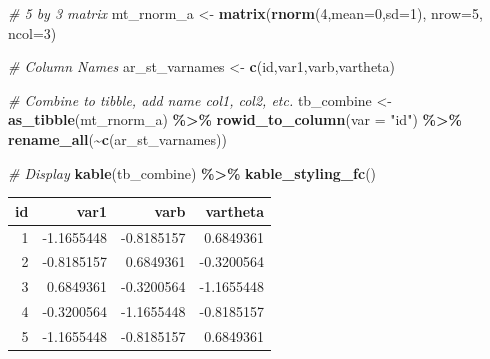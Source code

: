 \documentclass[
]{book}
\newenvironment{Shaded}{\begin{snugshade}}{\end{snugshade}}
\newcommand{\CommentTok}[1]{\textcolor[rgb]{0.56,0.35,0.01}{\textit{#1}}}
\newcommand{\DataTypeTok}[1]{\textcolor[rgb]{0.13,0.29,0.53}{#1}}
\newcommand{\DecValTok}[1]{\textcolor[rgb]{0.00,0.00,0.81}{#1}}
\newcommand{\KeywordTok}[1]{\textcolor[rgb]{0.13,0.29,0.53}{\textbf{#1}}}
\newcommand{\NormalTok}[1]{#1}
\newcommand{\OperatorTok}[1]{\textcolor[rgb]{0.81,0.36,0.00}{\textbf{#1}}}
\newcommand{\StringTok}[1]{\textcolor[rgb]{0.31,0.60,0.02}{#1}}
\begin{document}
\begin{Shaded}
\begin{Highlighting}[]
\CommentTok{\# 5 by 3 matrix}
\NormalTok{mt\_rnorm\_a \textless{}{-}}\StringTok{ }\KeywordTok{matrix}\NormalTok{(}\KeywordTok{rnorm}\NormalTok{(}\DecValTok{4}\NormalTok{,}\DataTypeTok{mean=}\DecValTok{0}\NormalTok{,}\DataTypeTok{sd=}\DecValTok{1}\NormalTok{), }\DataTypeTok{nrow=}\DecValTok{5}\NormalTok{, }\DataTypeTok{ncol=}\DecValTok{3}\NormalTok{)}

\CommentTok{\# Column Names}
\NormalTok{ar\_st\_varnames \textless{}{-}}\StringTok{ }\KeywordTok{c}\NormalTok{(}\StringTok{\textquotesingle{}id\textquotesingle{}}\NormalTok{,}\StringTok{\textquotesingle{}var1\textquotesingle{}}\NormalTok{,}\StringTok{\textquotesingle{}varb\textquotesingle{}}\NormalTok{,}\StringTok{\textquotesingle{}vartheta\textquotesingle{}}\NormalTok{)}

\CommentTok{\# Combine to tibble, add name col1, col2, etc.}
\NormalTok{tb\_combine \textless{}{-}}\StringTok{ }\KeywordTok{as\_tibble}\NormalTok{(mt\_rnorm\_a) }\OperatorTok{\%\textgreater{}\%}
\StringTok{  }\KeywordTok{rowid\_to\_column}\NormalTok{(}\DataTypeTok{var =} \StringTok{"id"}\NormalTok{) }\OperatorTok{\%\textgreater{}\%}
\StringTok{  }\KeywordTok{rename\_all}\NormalTok{(}\OperatorTok{\textasciitilde{}}\KeywordTok{c}\NormalTok{(ar\_st\_varnames))}

\CommentTok{\# Display}
\KeywordTok{kable}\NormalTok{(tb\_combine) }\OperatorTok{\%\textgreater{}\%}\StringTok{ }\KeywordTok{kable\_styling\_fc}\NormalTok{()}
\end{Highlighting}
\end{Shaded}

\begin{table}[!h]
\centering
\begin{tabular}{r|r|r|r}
\hline
id & var1 & varb & vartheta\\
\hline
\rowcolor{gray!6}  1 & -1.1655448 & -0.8185157 & 0.6849361\\
\hline
2 & -0.8185157 & 0.6849361 & -0.3200564\\
\hline
\rowcolor{gray!6}  3 & 0.6849361 & -0.3200564 & -1.1655448\\
\hline
4 & -0.3200564 & -1.1655448 & -0.8185157\\
\hline
\rowcolor{gray!6}  5 & -1.1655448 & -0.8185157 & 0.6849361\\
\hline
\end{tabular}
\end{table}
\end{document}
